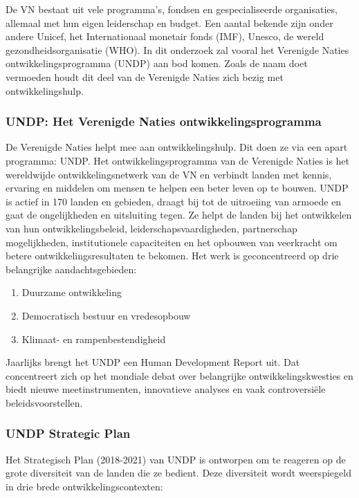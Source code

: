 De VN bestaat uit vele programma's, fondsen en gespecialiseerde organisaties, allemaal met hun eigen leiderschap en budget. Een aantal bekende zijn onder andere Unicef, het Internationaal monetair fonds (IMF), Unesco, de wereld gezondheidsorganisatie (WHO). In dit onderzoek zal vooral het Verenigde Naties ontwikkelingsprogramma (UNDP) aan bod komen. Zoals de naam doet vermoeden houdt dit deel van de Verenigde Naties zich bezig met ontwikkelingshulp.

\subsubsection{UNDP: Het Verenigde Naties ontwikkelingsprogramma}
De Verenigde Naties helpt mee aan ontwikkelingshulp. Dit doen ze via een apart programma: UNDP. Het ontwikkelingsprogramma van de Verenigde Naties is het wereldwijde ontwikkelingsnetwerk van de VN en verbindt landen met kennis, ervaring en middelen om mensen te helpen een beter leven op te bouwen. UNDP is actief in 170 landen en gebieden, draagt bij tot de uitroeiing van armoede en gaat de ongelijkheden en uitsluiting tegen. Ze helpt de landen bij het ontwikkelen van hun ontwikkelingsbeleid, leiderschapsvaardigheden, partnerschap mogelijkheden, institutionele capaciteiten en het opbouwen van veerkracht om betere ontwikkelingsresultaten te bekomen. \autocite{DevelopmentProgram2020}
Het werk is geconcentreerd op drie belangrijke aandachtsgebieden:

\begin{enumerate}
\item Duurzame ontwikkeling
\item Democratisch bestuur en vredesopbouw
\item Klimaat- en rampenbestendigheid
\end{enumerate}

 Jaarlijks brengt het UNDP een Human Development Report uit. Dat concentreert zich op het mondiale debat over belangrijke ontwikkelingskwesties en biedt nieuwe meetinstrumenten, innovatieve analyses en vaak controversiële beleidsvoorstellen. \autocite{DevelopmentProgram2020} 

\subsubsection{UNDP Strategic Plan}
Het Strategisch Plan (2018-2021) van UNDP is ontworpen om te reageren op de grote diversiteit van de landen die ze bedient. Deze diversiteit wordt weerspiegeld in drie brede ontwikkelingscontexten: \autocite{DevelopmentProgram2020}

